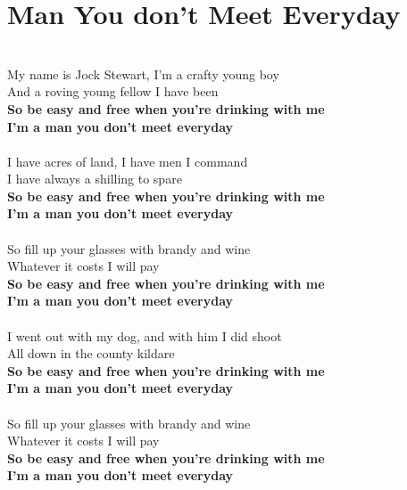 \documentclass[letterpaper,14pt]{extarticle}
\begin{document}
\section{Man You don't Meet Everyday}
\noindent
\\My name is Jock Stewart, I'm a crafty young boy
\\And a roving young fellow I have been
\\\textbf{So be easy and free when you're drinking with me
\\I'm a man you don't meet everyday}
\\
\\I have acres of land, I have men I command
\\I have always a shilling to spare
\\\textbf{So be easy and free when you're drinking with me
\\I'm a man you don't meet everyday}
\\
\\So fill up your glasses with brandy and wine
\\Whatever it costs I will pay
\\\textbf{So be easy and free when you're drinking with me
\\I'm a man you don't meet everyday}
\\
\\I went out with my dog, and with him I did shoot
\\All down in the county kildare
\\\textbf{So be easy and free when you're drinking with me
\\I'm a man you don't meet everyday}
\\
\\So fill up your glasses with brandy and wine
\\Whatever it costs I will pay
\\\textbf{So be easy and free when you're drinking with me
\\I'm a man you don't meet everyday}
\end{document}
